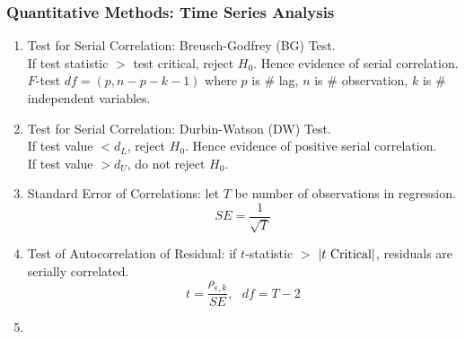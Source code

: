 \subsubsection{Quantitative Methods: Time Series Analysis}

\begin{enumerate}[label=\roman*.]
\setlength{\itemsep}{0pt}
\item Test for Serial Correlation: Breusch-Godfrey (BG) Test.\\
If test statistic $>$ test critical, reject $H_0$. Hence evidence of serial correlation.\\
$F$-test $df = (p, n-p-k-1)$ where $p$ is $\#$ lag, $n$ is $\#$ observation, $k$ is $\#$ independent variables.
\item Test for Serial Correlation: Durbin-Watson (DW) Test.\\
If test value $< d_L$, reject $H_0$. Hence evidence of positive serial correlation.\\
If test value $> d_U$, do not reject $H_0$.
\item Standard Error of Correlations: let $T$ be number of observations in regression.
\begin{equation}
SE = \frac{1}{\sqrt{T}} \nonumber
\end{equation}
\item Test of Autocorrelation of Residual: if $t$-statistic $>$ $\left\lvert t \text{ Critical}\right\rvert$, residuals are serially correlated.
\begin{equation}
t = \frac{\rho_{\epsilon, k}}{SE}, \ \ \ df = T - 2 \nonumber
\end{equation}
\item 
\end{enumerate}